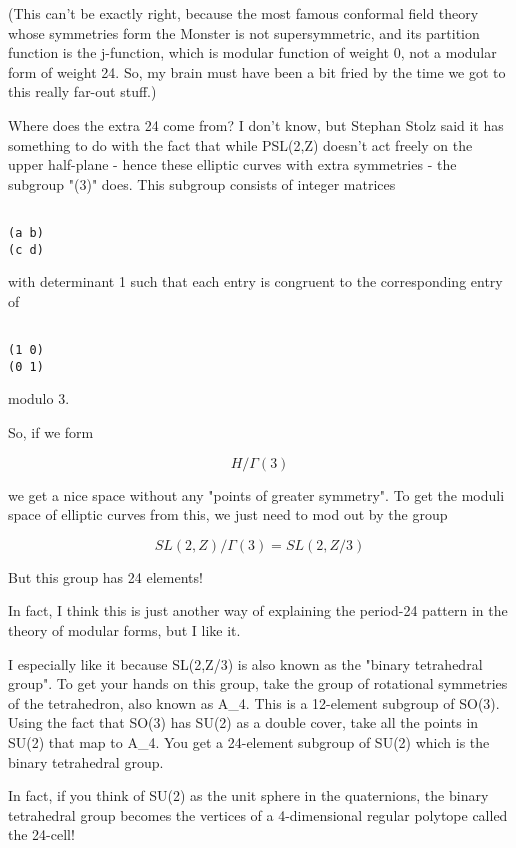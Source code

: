(This can't be exactly right, because the most famous conformal
field theory whose symmetries form the Monster is not supersymmetric,
and its partition function is the j-function, which is modular
function of weight 0, not a modular form of weight 24.  So, 
my brain must have been a bit fried by the time we got to this
really far-out stuff.) 

Where does the extra 24 come from?  I don't know, but Stephan Stolz 
said it has something to do with the fact that while PSL(2,Z) doesn't 
act freely on the upper half-plane - hence these elliptic curves with 
extra symmetries - the subgroup "\Gamma (3)" does.  This subgroup consists 
of integer matrices


\begin{verbatim}

(a b)
(c d)
\end{verbatim}
    
with determinant 1 such that each entry is congruent to the
corresponding entry of 

\begin{verbatim}

(1 0)
(0 1)
\end{verbatim}
    
modulo 3.

So, if we form


$$

H/\Gamma (3)
$$
    
we get a nice space without any "points of greater symmetry".
To get the moduli space of elliptic curves from this, we just 
need to mod out by the group 


$$

SL(2,Z)/\Gamma (3) = SL(2,Z/3)
$$
    
But this group has 24 elements!

In fact, I think this is just another way of explaining the 
period-24 pattern in the theory of modular forms, but I like
it.  

I especially like it because SL(2,Z/3) is also known as the 
"binary tetrahedral group".  To get your hands on this group,
take the group of rotational symmetries of the tetrahedron,
also known as A_{4}.  This is a 12-element subgroup of SO(3).  
Using the fact that SO(3) has SU(2) as a double cover, take 
all the points in SU(2) that map to A_{4}.  You get a 24-element
subgroup of SU(2) which is the binary tetrahedral group.

In fact, if you think of SU(2) as the unit sphere in the
quaternions, the binary tetrahedral group becomes the vertices
of a 4-dimensional regular polytope called the 24-cell!

